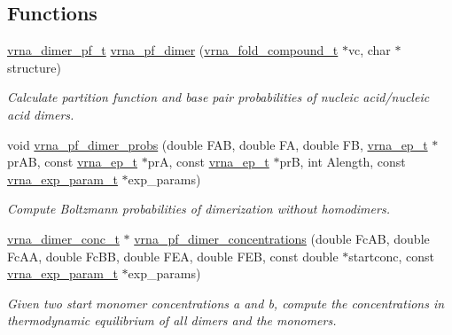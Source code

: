\subsection*{Functions}
\begin{DoxyCompactItemize}
\item 
\hyperlink{group__pf__cofold_ga444df1587c9a2ca15b8eb25188f629c3}{vrna\+\_\+dimer\+\_\+pf\+\_\+t} \hyperlink{group__pf__cofold_ga4e5c7d06c302a7c59fc0d64dc142ca63}{vrna\+\_\+pf\+\_\+dimer} (\hyperlink{group__fold__compound_ga1b0cef17fd40466cef5968eaeeff6166}{vrna\+\_\+fold\+\_\+compound\+\_\+t} $\ast$vc, char $\ast$structure)
\begin{DoxyCompactList}\small\item\em Calculate partition function and base pair probabilities of nucleic acid/nucleic acid dimers. \end{DoxyCompactList}\item 
void \hyperlink{group__pf__cofold_gaa1e39e73afb51fbaf4ae38f0c066c46b}{vrna\+\_\+pf\+\_\+dimer\+\_\+probs} (double F\+AB, double FA, double FB, \hyperlink{group__struct__utils_gab9ac98ab55ded9fb90043b024b915aca}{vrna\+\_\+ep\+\_\+t} $\ast$pr\+AB, const \hyperlink{group__struct__utils_gab9ac98ab55ded9fb90043b024b915aca}{vrna\+\_\+ep\+\_\+t} $\ast$prA, const \hyperlink{group__struct__utils_gab9ac98ab55ded9fb90043b024b915aca}{vrna\+\_\+ep\+\_\+t} $\ast$prB, int Alength, const \hyperlink{group__energy__parameters_ga01d8b92fe734df8d79a6169482c7d8d8}{vrna\+\_\+exp\+\_\+param\+\_\+t} $\ast$exp\+\_\+params)
\begin{DoxyCompactList}\small\item\em Compute Boltzmann probabilities of dimerization without homodimers. \end{DoxyCompactList}\item 
\hyperlink{group__pf__cofold_gac48c2723444ecfdceafcfd525ca98322}{vrna\+\_\+dimer\+\_\+conc\+\_\+t} $\ast$ \hyperlink{group__pf__cofold_ga83b8d5d0f7875d6d5013b208f23e3356}{vrna\+\_\+pf\+\_\+dimer\+\_\+concentrations} (double Fc\+AB, double Fc\+AA, double Fc\+BB, double F\+EA, double F\+EB, const double $\ast$startconc, const \hyperlink{group__energy__parameters_ga01d8b92fe734df8d79a6169482c7d8d8}{vrna\+\_\+exp\+\_\+param\+\_\+t} $\ast$exp\+\_\+params)
\begin{DoxyCompactList}\small\item\em Given two start monomer concentrations a and b, compute the concentrations in thermodynamic equilibrium of all dimers and the monomers. \end{DoxyCompactList}\end{DoxyCompactItemize}
